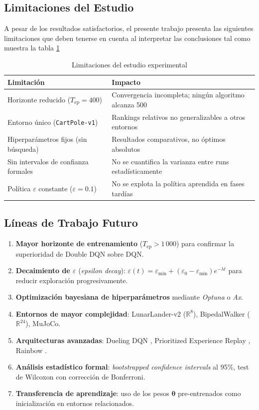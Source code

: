\subsection{Limitaciones del Estudio}

A pesar de los resultados satisfactorios, el presente trabajo presenta las siguientes limitaciones que deben tenerse en cuenta al interpretar las conclusiones tal como muestra la tabla \ref{tab:limitaciones}

\begin{table}[htb!]
\caption{Limitaciones del estudio experimental}\label{tab:limitaciones}
\centering\small
\begin{tabular}{@{}lp{9cm}@{}}
\toprule
\textbf{Limitación} & \textbf{Impacto} \\
\midrule
Horizonte reducido ($T_\text{ep} = 400$) & Convergencia incompleta; ningún algoritmo alcanza 500 \\
Entorno único (\texttt{CartPole-v1}) & Rankings relativos no generalizables a otros entornos \\
Hiperparámetros fijos (sin búsqueda) & Resultados comparativos, no óptimos absolutos \\
Sin intervalos de confianza formales & No se cuantifica la varianza entre runs estadísticamente \\
Política $\varepsilon$ constante ($\varepsilon = 0.1$) & No se explota la política aprendida en fases tardías \\
\bottomrule
\end{tabular}
\end{table}

\subsection{Líneas de Trabajo Futuro}

\begin{enumerate}
  \item \textbf{Mayor horizonte de entrenamiento} ($T_\text{ep} > 1\,000$) para confirmar la superioridad de Double DQN sobre DQN.
  \item \textbf{Decaimiento de $\varepsilon$} (\textit{epsilon decay}): $\varepsilon(t) = \varepsilon_{\min} + (\varepsilon_0 - \varepsilon_{\min}) e^{-\lambda t}$ para reducir exploración progresivamente.
  \item \textbf{Optimización bayesiana de hiperparámetros} mediante \textit{Optuna} o \textit{Ax}.
  \item \textbf{Entornos de mayor complejidad}: LunarLander-v2 ($\mathbb{R}^8$), BipedalWalker ($\mathbb{R}^{24}$), MuJoCo.
  \item \textbf{Arquitecturas avanzadas}: Dueling DQN \cite{Wang2016}, Prioritized Experience Replay \cite{Schaul2016}, Rainbow \cite{Hessel2018}.
  \item \textbf{Análisis estadístico formal}: \textit{bootstrapped confidence intervals} al 95\%, test de Wilcoxon con corrección de Bonferroni.
  \item \textbf{Transferencia de aprendizaje}: uso de los pesos $\boldsymbol{\theta}$ pre-entrenados como inicialización en entornos relacionados.
\end{enumerate}

